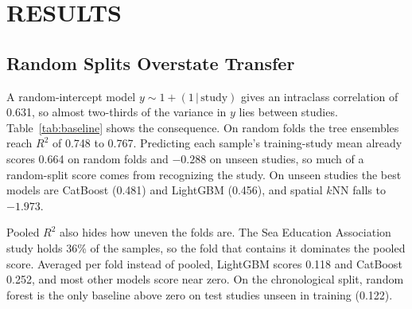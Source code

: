 \documentclass[12pt,a4paper]{report}
\newcommand{\Rsq}{$R^2$}
\begin{document}
\chapter{RESULTS}

\section{Random Splits Overstate Transfer}

A random-intercept model $y\sim1+(1\,|\,\text{study})$ gives an intraclass correlation of 0.631, so almost two-thirds of the variance in $y$ lies between studies. Table~\ref{tab:baseline} shows the consequence. On random folds the tree ensembles reach \Rsq{} of 0.748 to 0.767. Predicting each sample's training-study mean already scores 0.664 on random folds and $-0.288$ on unseen studies, so much of a random-split score comes from recognizing the study. On unseen studies the best models are CatBoost (0.481) and LightGBM (0.456), and spatial $k$NN falls to $-1.973$.

Pooled \Rsq{} also hides how uneven the folds are. The Sea Education Association study holds 36\% of the samples, so the fold that contains it dominates the pooled score. Averaged per fold instead of pooled, LightGBM scores 0.118 and CatBoost 0.252, and most other models score near zero. On the chronological split, random forest is the only baseline above zero on test studies unseen in training (0.122).
\end{document}
